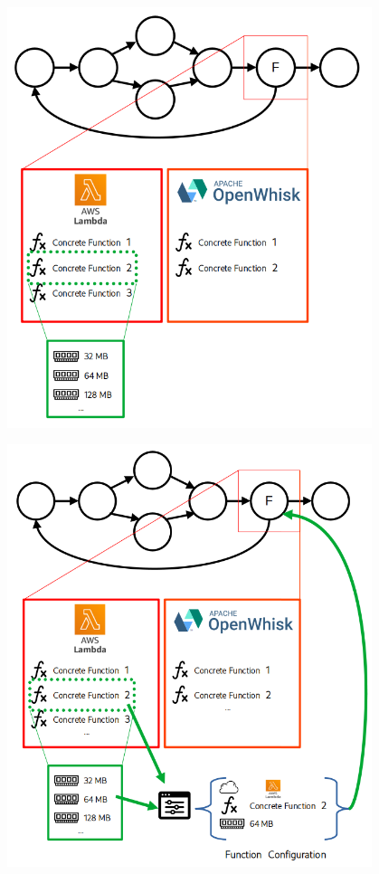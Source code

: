 \documentclass[13.5pt]{beamer}
\begin{document}
\begin{frame}[noframenumbering]
	
	\begin{center}
		\includegraphics[width=0.8\textwidth,height=0.95\textheight]{../Images/ExampleSlide3.png}
	\end{center}
	
\end{frame} 

\begin{frame}
	
	\begin{center}
		\includegraphics[width=0.8\textwidth,height=0.95\textheight]{../Images/ExampleSlide4.png}
	\end{center}
	
\end{frame} 
\end{document}

